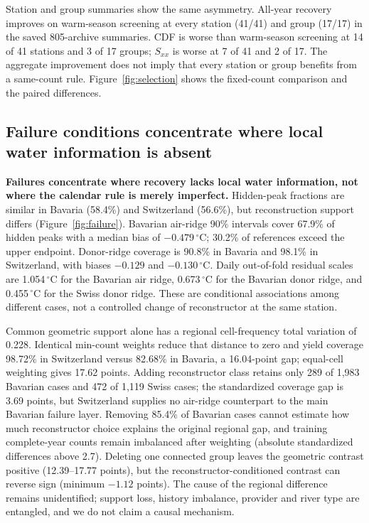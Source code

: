Station and group summaries show the same asymmetry. All-year recovery improves on warm-season screening at every station (41/41) and group (17/17) in the saved 805-archive summaries. CDF is worse than warm-season screening at 14 of 41 stations and 3 of 17 groups; $S_{xx}$ is worse at 7 of 41 and 2 of 17. The aggregate improvement does not imply that every station or group benefits from a same-count rule. Figure~\ref{fig:selection} shows the fixed-count comparison and the paired differences.

\subsection{Failure conditions concentrate where local water information is absent}

\textbf{Failures concentrate where recovery lacks local water information, not where the calendar rule is merely imperfect.} Hidden-peak fractions are similar in Bavaria (58.4\%) and Switzerland (56.6\%), but reconstruction support differs (Figure~\ref{fig:failure}). Bavarian air-ridge 90\% intervals cover 67.9\% of hidden peaks with a median bias of $-0.479$\,$^{\circ}$C; 30.2\% of references exceed the upper endpoint. Donor-ridge coverage is 90.8\% in Bavaria and 98.1\% in Switzerland, with biases $-0.129$ and $-0.130$\,$^{\circ}$C. Daily out-of-fold residual scales are 1.054\,$^{\circ}$C for the Bavarian air ridge, 0.673\,$^{\circ}$C for the Bavarian donor ridge, and 0.455\,$^{\circ}$C for the Swiss donor ridge. These are conditional associations among different cases, not a controlled change of reconstructor at the same station.

Common geometric support alone has a regional cell-frequency total variation of 0.228. Identical min-count weights reduce that distance to zero and yield coverage 98.72\% in Switzerland versus 82.68\% in Bavaria, a 16.04-point gap; equal-cell weighting gives 17.62 points. Adding reconstructor class retains only 289 of 1,983 Bavarian cases and 472 of 1,119 Swiss cases; the standardized coverage gap is 3.69 points, but Switzerland supplies no air-ridge counterpart to the main Bavarian failure layer. Removing 85.4\% of Bavarian cases cannot estimate how much reconstructor choice explains the original regional gap, and training complete-year counts remain imbalanced after weighting (absolute standardized differences above 2.7). Deleting one connected group leaves the geometric contrast positive (12.39--17.77 points), but the reconstructor-conditioned contrast can reverse sign (minimum $-1.12$ points). The cause of the regional difference remains unidentified; support loss, history imbalance, provider and river type are entangled, and we do not claim a causal mechanism.

